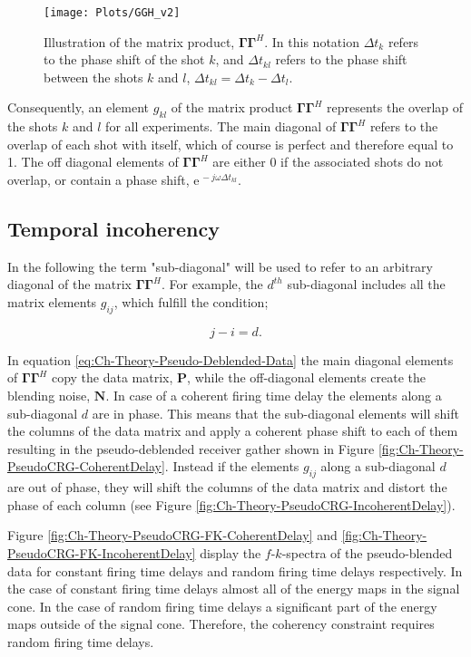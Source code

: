 \begin{figure}
	\centering
	\texttt{[image: Plots/GGH\_v2]}
	\caption{Illustration of the matrix product, $\mathbf{\Gamma \Gamma}^H$. In this notation $\Delta t_k$ refers to the phase shift of the shot $k$, and $\Delta t_{kl}$ refers to the phase shift between the shots $k$ and $l$, $\Delta t_{kl} = \Delta t_k - \Delta t_l$.}
	\label{fig:Ch-Theory-GGH}
\end{figure}

Consequently, an element $g_{kl}$ of the matrix product $\mathbf{\Gamma \Gamma}^H$ represents the overlap of the shots $k$ and $l$ for all experiments. The main diagonal of $\mathbf{\Gamma \Gamma}^H$ refers to the overlap of each shot with itself, which of course is perfect and therefore equal to 1. The off diagonal elements of $\mathbf{\Gamma \Gamma}^H$ are either 0 if the associated shots do not overlap, or contain a phase shift, $\mathrm{e}^{\, -j \omega \Delta t_{kl}}$.

\subsection*{Temporal incoherency}

In the following the term "sub-diagonal" will be used to refer to an arbitrary diagonal of the matrix $\mathbf{\Gamma \Gamma}^H$. For example, the $d^{th}$ sub-diagonal includes all the matrix elements $g_{ij}$, which fulfill the condition;

\begin{equation}
	j -i = d.
	\label{eq:Ch-Incoherency-Subdiagonal}
\end{equation}

In equation \ref{eq:Ch-Theory-Pseudo-Deblended-Data} the main diagonal elements of $\mathbf{\Gamma \Gamma}^H$ copy the data matrix, $\mathbf{P}$, while the off-diagonal elements create the blending noise, $\mathbf{N}$. In case of a coherent firing time delay the elements along a sub-diagonal $d$ are in phase. This means that the sub-diagonal elements will shift the columns of the data matrix and apply a coherent phase shift to each of them resulting in the pseudo-deblended receiver gather shown in Figure \ref{fig:Ch-Theory-PseudoCRG-CoherentDelay}. Instead if the elements $g_{ij}$ along a sub-diagonal $d$ are out of phase, they will shift the columns of the data matrix and distort the phase of each column (see Figure \ref{fig:Ch-Theory-PseudoCRG-IncoherentDelay}). 

Figure \ref{fig:Ch-Theory-PseudoCRG-FK-CoherentDelay} and \ref{fig:Ch-Theory-PseudoCRG-FK-IncoherentDelay} display the $f$-$k$-spectra of the pseudo-blended data for constant firing time delays and random firing time delays respectively. In the case of constant firing time delays almost all of the energy maps in the signal cone. In the case of random firing time delays a significant part of the energy maps outside of the signal cone. Therefore, the coherency constraint requires random firing time delays. 

